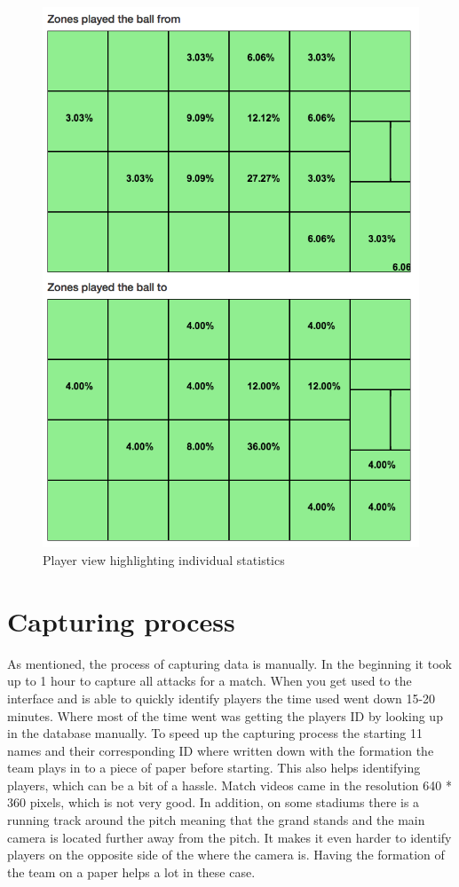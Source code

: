 \begin{figure}[H]
\centering
\includegraphics[width=1\textwidth]{images/general/player_view2.png}
\caption{Player view highlighting individual statistics}
\label{fig:player_view2}
\end{figure}


\section{Capturing process}
\label{sec:capprocess}

As mentioned, the process of capturing data is manually. In the beginning it took up to 1 hour to capture all attacks for a match. When you get used to the interface and is able to quickly identify players the time used went down 15-20 minutes. Where most of the time went was getting the players ID by looking up in the database manually. To speed up the capturing process the starting 11 names and their corresponding ID where written down with the formation the team plays in to a piece of paper before starting. This also helps identifying players, which can be a bit of a hassle. Match videos came in the resolution 640 * 360 pixels, which is not very good. In addition, on some stadiums there is a running track around the pitch meaning that the grand stands and the main camera is located further away from the pitch. It makes it even harder to identify players on the opposite side of the where the camera is. Having the formation of the team on a paper helps a lot in these case.

